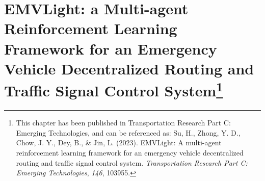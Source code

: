 \chapter[EMVLight: a Multi-agent Reinforcement Learning Framework for an Emergency Vehicle Decentralized Routing and Traffic Signal Control System]%
{EMVLight: a Multi-agent Reinforcement Learning Framework for an Emergency Vehicle Decentralized Routing and Traffic Signal Control System\footnote{This chapter has been published in Transportation Research Part C: Emerging Technologies, and can be referenced as: Su, H., Zhong, Y. D., Chow, J. Y., Dey, B., \& Jin, L. (2023). EMVLight: A multi-agent reinforcement learning framework for an emergency vehicle decentralized routing and traffic signal control system. \textit{Transportation Research Part C: Emerging Technologies}, \textit{146}, 103955.}}
\label{chap:emvlight}


